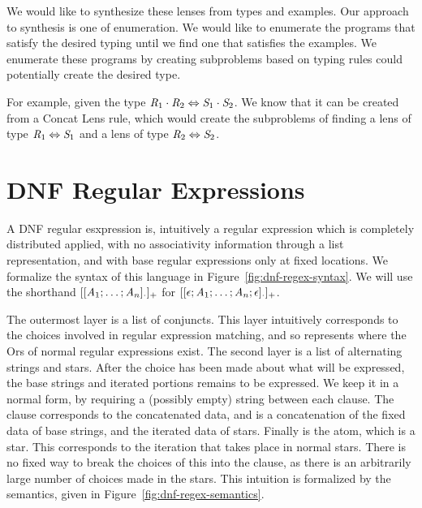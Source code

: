 We would like to synthesize these lenses from types and examples.
Our approach to synthesis is one of enumeration.
We would like to enumerate the programs that satisfy the desired typing until
we find one that satisfies the examples.
We enumerate these programs by creating subproblems based on typing rules
could potentially create the desired type.

For example, given the type $\mathit{R}_1\cdot\mathit{R}_2\Leftrightarrow\mathit{S}_1\cdot\mathit{S}_2$.
We know that it can be created from a Concat Lens rule,
which would create the subproblems of finding a lens of type $\mathit{R}_1\Leftrightarrow\mathit{S}_1$
and a lens of type $\mathit{R}_2\Leftrightarrow\mathit{S}_2$.

\section{DNF Regular Expressions}


A DNF regular esxpression is, intuitively
a regular expression which is completely distributed
applied, with no associativity information through a list representation,
and with base regular expressions only at fixed locations.
We formalize the syntax of this language in Figure~\ref{fig:dnf-regex-syntax}.
We will use the shorthand $[[\mathit{A}_1;\ldots;\mathit{A}_n]_{\cdot}]_{+}$
for $[[\epsilon;\mathit{A}_1;\ldots;\mathit{A}_n;\epsilon]_{\cdot}]_{+}$.

The outermost layer is a list of conjuncts.
This layer intuitively corresponds to the choices involved in regular expression matching, and so represents where the Ors of normal regular expressions exist.
The second layer is a list of alternating strings and stars.
After the choice has been made about what will be expressed,
the base strings and iterated portions remains to be expressed.
We keep it in a normal form, by requiring a (possibly empty) string between
each clause.
The clause corresponds to the concatenated data, and is a concatenation of the
fixed data of base strings, and the iterated data of stars.
Finally is the atom, which is a star.
This corresponds to the iteration that takes place in normal stars.
There is no fixed way to break the choices of this into the clause,
as there is an arbitrarily large number of choices made in the stars.
This intuition is formalized by the semantics, given in
Figure~\ref{fig:dnf-regex-semantics}.   

